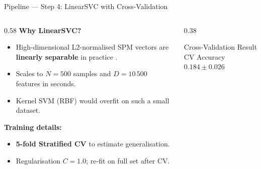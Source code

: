 \begin{frame}{Pipeline — Step 4: LinearSVC with Cross-Validation}
  \begin{columns}
    \begin{column}{0.58\textwidth}
      \textbf{Why LinearSVC?}
      \begin{itemize}
        \item High-dimensional L2-normalised SPM vectors are \textbf{linearly separable} in practice \cite{lazebnik2006}.
        \item Scales to $N = 500$ samples and $D = 10\,500$ features in seconds.
        \item Kernel SVM (RBF) would overfit on such a small dataset.
      \end{itemize}
      \vspace{0.5em}
      \textbf{Training details:}
      \begin{itemize}
        \item \textbf{5-fold Stratified CV} to estimate generalisation.
        \item Regularisation $C = 1.0$; re-fit on full set after CV.
      \end{itemize}
    \end{column}
    \begin{column}{0.38\textwidth}
      \begin{block}{Cross-Validation Result}
        \centering
        \vspace{0.3em}
        CV Accuracy\\[0.4em]
        \Large$\mathbf{0.184 \pm 0.026}$
        \vspace{0.3em}
      \end{block}
    \end{column}
  \end{columns}
\end{frame}

